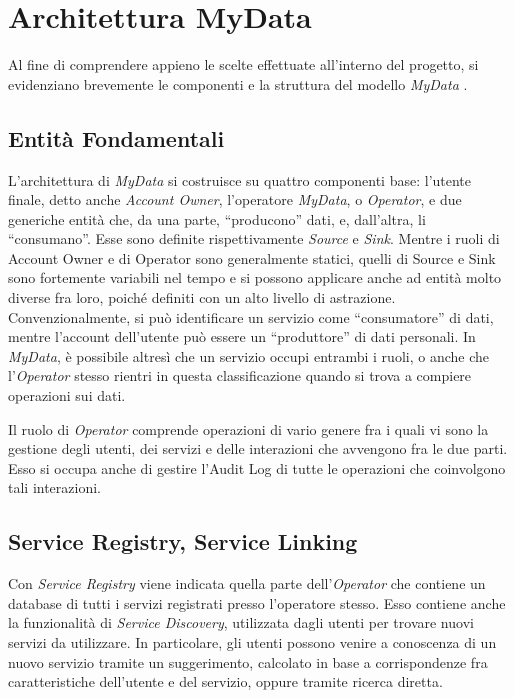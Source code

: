 \chapter{Architettura MyData}
\label{capitolo3}
\thispagestyle{empty}

\noindent Al fine di comprendere appieno le scelte effettuate all’interno del progetto, si evidenziano brevemente le componenti e la struttura del modello \textit{MyData} \cite{githubmydatastack}. 

\section{Entit\`a Fondamentali}
L’architettura di \textit{MyData} si costruisce su quattro componenti base: l’utente finale, detto anche \textit{Account Owner}, l’operatore \textit{MyData}, o \textit{Operator}, e due generiche entit\`a che, da una parte, “producono” dati, e, dall’altra, li “consumano”. Esse sono definite rispettivamente \textit{Source} e \textit{Sink}. Mentre i ruoli di Account Owner e di Operator sono generalmente statici, quelli di Source e Sink sono fortemente variabili nel tempo e si possono applicare anche ad entit\`a molto diverse fra loro, poich\'e definiti con un alto livello di astrazione. Convenzionalmente, si pu\`o identificare un servizio come “consumatore” di dati, mentre l’account dell’utente pu\`o essere un “produttore” di dati personali. In \textit{MyData}, \`e possibile altres\`i che un servizio occupi entrambi i ruoli, o anche che l’\textit{Operator} stesso rientri in questa classificazione quando si trova a compiere operazioni sui dati.

Il ruolo di \textit{Operator} comprende operazioni di vario genere fra i quali vi sono la gestione degli utenti, dei servizi e delle interazioni che avvengono fra le due parti. Esso si occupa anche di gestire l’Audit Log di tutte le operazioni che coinvolgono tali interazioni.

\section{Service Registry, Service Linking}
Con \textit{Service Registry} viene indicata quella parte dell’\textit{Operator} che contiene un database di tutti i servizi registrati presso l’operatore stesso. Esso contiene anche la funzionalit\`a di \textit{Service Discovery}, utilizzata dagli utenti per trovare nuovi servizi da utilizzare. In particolare, gli utenti possono venire a conoscenza di un nuovo servizio tramite un suggerimento, calcolato in base a corrispondenze fra caratteristiche dell’utente e del servizio, oppure tramite ricerca diretta.

